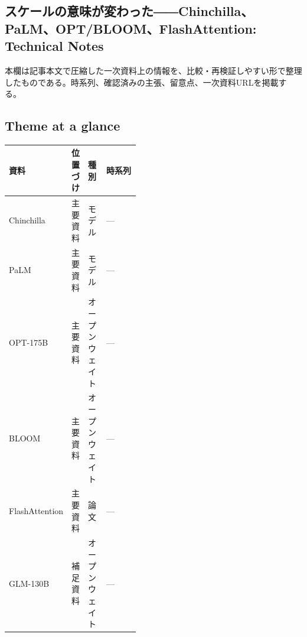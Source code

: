 \subsection*{スケールの意味が変わった――Chinchilla、PaLM、OPT/BLOOM、FlashAttention: Technical Notes}
本欄は記事本文で圧縮した一次資料上の情報を、比較・再検証しやすい形で整理したものである。時系列、確認済みの主張、留意点、一次資料URLを掲載する。
\medskip
\subsection*{Theme at a glance}
\begin{center}
\footnotesize
\begin{tabularx}{\linewidth}{@{}p{0.20\linewidth}p{0.10\linewidth}p{0.14\linewidth}X@{}}
\toprule
資料 & 位置づけ & 種別 & 時系列 \\
\midrule
Chinchilla & 主要資料 & モデル & — \\
PaLM & 主要資料 & モデル & — \\
OPT-175B & 主要資料 & オープンウェイト & — \\
BLOOM & 主要資料 & オープンウェイト & — \\
FlashAttention & 主要資料 & 論文 & — \\
GLM-130B & 補足資料 & オープンウェイト & — \\
\bottomrule
\end{tabularx}
\end{center}
\normalsize

